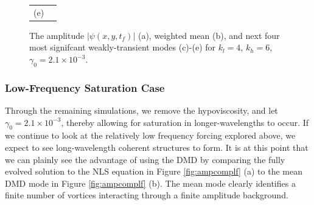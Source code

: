 \documentclass[a4paper,11pt]{article}
\begin{document}
\begin{figure}[!ht]
\begin{tabular}{cc}
(e) & 
\end{tabular}
\caption{The amplitude $\left|\psi(x,y,t_{f})\right|$ (a), weighted mean (b), and next four most signifcant weakly-transient modes (c)-(e) for $k_{l}=4$, $k_{h}=6$, $\gamma_{0}=2.1\times 10^{-3}$. }
\label{fig:ampcompwwt}
\end{figure}

\subsubsection*{Low-Frequency Saturation Case}
Through the remaining simulations, we remove the hypoviscosity, and let $\gamma_{0}=2.1\times 10^{-3}$, thereby allowing for saturation in longer-wavelengths to occur.  If we continue to look at the relatively low frequency forcing explored above, we expect to see long-wavelength coherent structures to form.  It is at this point that we can plainly see the advantage of using the DMD by comparing the fully evolved solution to the NLS equation in Figure \ref{fig:ampcomplf} (a) to the mean DMD mode in Figure \ref{fig:ampcomplf} (b).  The mean mode clearly identifies a finite number of vortices interacting through a finite amplitude background.  
\end{document}

